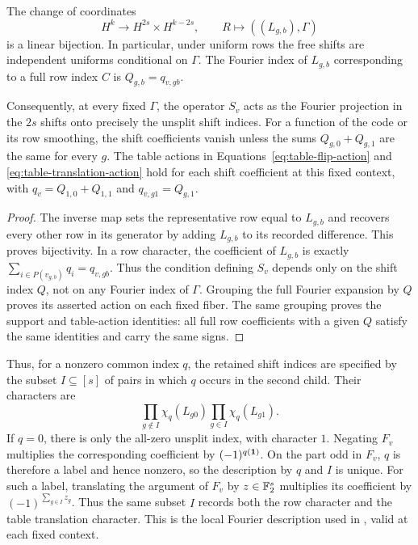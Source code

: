 \begin{lemma}
\label{lem:shift-coordinates}
The change of coordinates
\[
 H^k\longrightarrow H^{2s}\times H^{k-2s},\qquad
 R\longmapsto((L_{g,b}),\Gamma)
\]
is a linear bijection.  In particular, under uniform rows the
free shifts are independent uniforms conditional on $\Gamma$.
The Fourier index of $L_{g,b}$ corresponding to a full row
index $C$ is $Q_{g,b}=q_{v,g b}$.

Consequently, at every fixed $\Gamma$, the operator $S_v$ acts
as the Fourier projection in the $2s$ shifts onto precisely the
unsplit shift indices.  For a function of the code or its row
smoothing, the shift coefficients vanish unless the sums
$Q_{g,0}+Q_{g,1}$ are the same for every $g$.  The table actions
in Equations~\eqref{eq:table-flip-action} and
\eqref{eq:table-translation-action} hold for each shift
coefficient at this fixed context, with
$q_v=Q_{1,0}+Q_{1,1}$ and $q_{v,g1}=Q_{g,1}$.
\end{lemma}

\begin{proof}
The inverse map sets the representative row equal to $L_{g,b}$
and recovers every other row in its generator by adding
$L_{g,b}$ to its recorded difference.  This proves bijectivity.
In a row character, the coefficient of $L_{g,b}$ is exactly
$\sum_{i\in P(v_{g,b})}q_i=q_{v,g b}$.
Thus the condition defining $S_v$ depends only on the shift
index $Q$, not on any Fourier index of $\Gamma$.  Grouping the
full Fourier expansion by $Q$ proves its asserted action on
each fixed fiber.  The same grouping proves the support and
table-action identities: all full row coefficients with a
given $Q$ satisfy the same identities and carry the same signs.
\end{proof}

Thus, for a nonzero common index $q$, the retained shift indices are
specified by the subset $I\subseteq[s]$ of pairs in which $q$ occurs
in the second child. Their characters are
\[
 \prod_{g\notin I}\chi_q(L_{g0})
 \prod_{g\in I}\chi_q(L_{g1}).
\]
If $q=0$, there is only the all-zero unsplit index, with character $1$.
Negating $F_v$ multiplies the corresponding coefficient by
$(-1)^{q(\mathbf 1)}$. On the part odd in $F_v$, $q$ is therefore a label
and hence nonzero, so the description by $q$ and $I$ is unique.
For such a label, translating the argument of $F_v$ by $z\in\mathbb F_2^s$
multiplies its coefficient by $(-1)^{\sum_{g\in I}z_g}$.
Thus the same subset $I$ records both the row character and the table
translation character. This is the local Fourier description used
in , valid at each fixed context.

